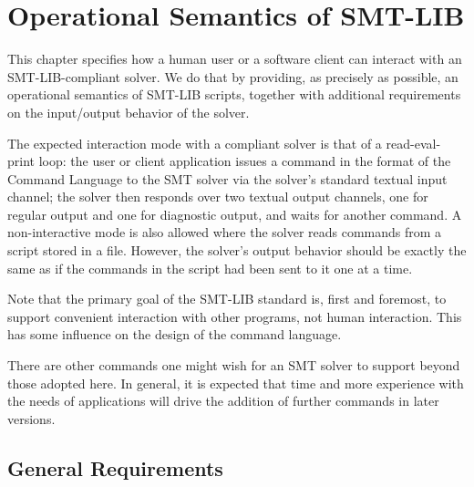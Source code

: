 


\chapter{Operational Semantics of SMT-LIB} \label{chap:operational-semantics}
\thispagestyle{empty}


This chapter specifies how a human user or a software client can interact with 
an SMT-LIB-compliant solver. 
We do that by providing, as precisely as possible, an operational semantics 
of SMT-LIB scripts, together with additional requirements on the input/output 
behavior of the solver.

The expected interaction mode with a compliant solver is 
that of a read-eval-print loop: 
the user or client application issues a command in the format 
of the Command Language to the SMT solver via the solver's 
standard textual input channel;
the solver then responds over two textual output channels, 
one for regular output and one for diagnostic output,
and waits for another command.
A non-interactive mode is also allowed where the solver reads commands 
from a script stored in a file.
However, the solver's output behavior should be exactly the same as 
if the commands in the script had been sent to it one at a time.
 
Note that the primary goal of the SMT-LIB standard is, first and foremost,
to support convenient interaction with other programs, not human interaction.  
This has some influence on the design of the command language.  

There are other commands one might wish for an SMT solver to support
beyond those adopted here.  
In general, it is expected that time and more experience with the needs 
of applications will drive the addition of further commands in later versions.


\section{General Requirements} \label{sec:requirements}

